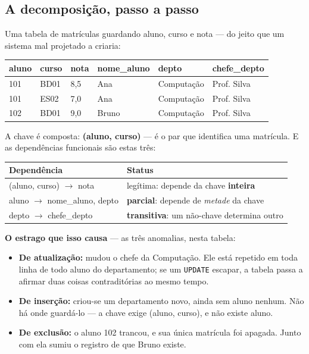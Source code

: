 \subsection{A decomposição, passo a passo}

Uma tabela de matrículas guardando aluno, curso e nota --- do jeito que um
sistema mal projetado a criaria:

\begin{center}
\small
\begin{tabular}{@{}llllll@{}}
\toprule
\textbf{aluno} & \textbf{curso} & \textbf{nota} & \textbf{nome\_aluno} & \textbf{depto} & \textbf{chefe\_depto} \\
\midrule
101 & BD01 & 8,5 & Ana   & Computação & Prof. Silva \\
101 & ES02 & 7,0 & Ana   & Computação & Prof. Silva \\
102 & BD01 & 9,0 & Bruno & Computação & Prof. Silva \\
\bottomrule
\end{tabular}
\end{center}

A chave é composta: \textbf{(aluno, curso)} --- é o par que identifica uma
matrícula. E as dependências funcionais são estas três:

\begin{center}
\begin{tabular}{@{}p{5cm}p{7.4cm}@{}}
\toprule
\textbf{Dependência} & \textbf{Status} \\
\midrule
(aluno, curso) $\to$ nota & legítima: depende da chave \textbf{inteira} \\
aluno $\to$ nome\_aluno, depto & \textbf{parcial}: depende de \emph{metade} da chave \\
depto $\to$ chefe\_depto & \textbf{transitiva}: um não-chave determina outro \\
\bottomrule
\end{tabular}
\end{center}

\textbf{O estrago que isso causa} --- as três anomalias, nesta tabela:

\begin{itemize}
\item \textbf{De atualização:} mudou o chefe da Computação. Ele está repetido
em toda linha de todo aluno do departamento; se um \texttt{UPDATE} escapar, a
tabela passa a afirmar duas coisas contraditórias ao mesmo tempo.
\item \textbf{De inserção:} criou-se um departamento novo, ainda sem aluno
nenhum. Não há onde guardá-lo --- a chave exige (aluno, curso), e não existe
aluno.
\item \textbf{De exclusão:} o aluno 102 trancou, e sua única matrícula foi
apagada. Junto com ela sumiu o registro de que Bruno existe.
\end{itemize}

